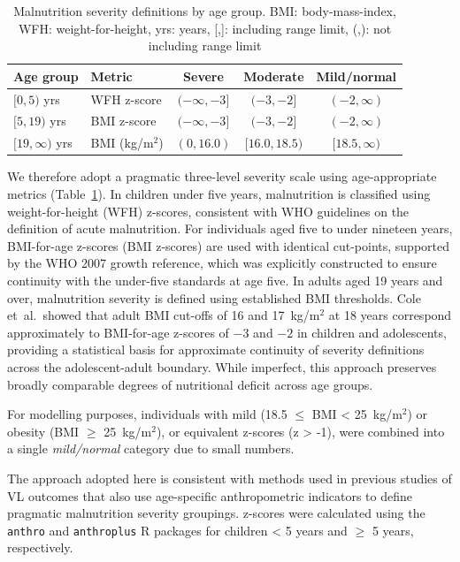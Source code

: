 \begin{table}[tb]
  \centering
  \caption{Malnutrition severity definitions by age group. BMI: body-mass-index, WFH: weight-for-height, yrs: years, [,]: including range limit, (,): not including range limit}
  \label{tab:malnutrition}
  \begin{tabular}{llccc}
    \toprule
    \textbf{Age group} & \textbf{Metric} & \textbf{Severe} & \textbf{Moderate} & \textbf{Mild/normal} \\
    \midrule
    $[0,5)$ yrs        & WFH z-score     & $(-\infty, -3]$ & $(-3,-2]$         & $(-2, \infty)$       \\
    $[5,19)$ yrs       & BMI z-score     & $(-\infty, -3]$ & $(-3,-2]$         & $(-2, \infty)$       \\
    $[19, \infty)$ yrs & BMI (kg/m$^2$)  & $(0, 16.0)$     & $[16.0, 18.5)$    & $[18.5, \infty)$     \\
    \bottomrule
  \end{tabular}
\end{table}

We therefore adopt a pragmatic three-level severity scale using age-appropriate metrics (Table~\ref{tab:malnutrition}). In children under five years, malnutrition is classified using weight-for-height (WFH) z-scores, consistent with WHO guidelines on the definition of acute malnutrition\cite{WHO-nutrition-2023}. For individuals aged five to under nineteen years, BMI-for-age z-scores (BMI z-scores) are used with identical cut-points, supported by the WHO 2007 growth reference, which was explicitly constructed to ensure continuity with the under-five standards at age five\cite{deonis2007}. In adults aged 19 years and over, malnutrition severity is defined using established BMI thresholds. Cole et~al.\ showed that adult BMI cut-offs of 16 and 17~kg/m$^2$ at 18 years correspond approximately to BMI-for-age z-scores of $-3$ and $-2$ in children and adolescents, providing a statistical basis for approximate continuity of severity definitions across the adolescent-adult boundary\cite{cole2007}. While imperfect, this approach preserves broadly comparable degrees of nutritional deficit across age groups.

For modelling purposes, individuals with mild (18.5 $\leq$ BMI < 25~kg/m$^2$) or obesity (BMI $\geq$ 25~kg/m$^2$), or equivalent z-scores (z > -1), were combined into a single \emph{mild/normal} category due to small numbers.

The approach adopted here is consistent with methods used in previous studies of VL outcomes that also use age-specific anthropometric indicators to define pragmatic malnutrition severity groupings\cite{burza2014,dorlo2017,gorski2010,naylor-leyland2022}. z-scores were calculated using the \texttt{anthro} and \texttt{anthroplus} R packages for children < 5 years and $\geq$ 5 years, respectively\cite{schumacher2023,schumacher2021}.

